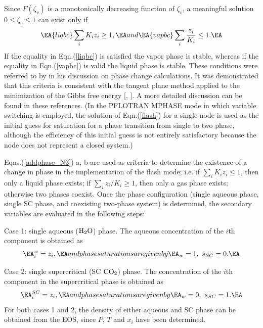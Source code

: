 \documentclass[12pt]{article}
\def\BA#1\EA{\begin{align}#1\end{align}}
\renewcommand{\c}{{\rm CO_2}}
\newcommand{\w}{{\rm H_2O}}
\begin{document}
Since $F(\zeta_v)$ is a monotonically decreasing function of $\zeta_v$, a meaningful solution $0\leq\zeta_v\leq1$ can exist only if 
\begin{subequations}\label{addphase_N3}
\BA\label{liqbc}
\sum_i K_i z_i \geq 1,
\EA
and
\BA\label{vapbc}
\sum_i \frac{z_i}{K_i} \leq 1.
\EA
\end{subequations}
If the equality in Eqn.(\ref{liqbc}) is satisfied the vapor phase is stable, whereas if the equality in Eqn.(\ref{vapbc}) is valid the liquid phase is stable. 
These conditions were referred to by \cite{michelsen-2-1982} in his discussion on phase change calculations. 
It was demonstrated that this criteria is consistent with the tangent plane method applied to the minimization of the Gibbs free energy [\cite{michelsen-1-1982}, \cite{nghiem-1985}]. A more detailed discussion can be found in these references. (In the PFLOTRAN MPHASE mode in which variable switching is employed, the solution of Eqn.(\ref{flash}) for a single node is used as the initial guess for saturation for a phase transition from single to two phase, although the efficiency of this initial guess is not entirely satisfactory because the node does not represent a closed system.)

Eqns.(\ref{addphase_N3}) a, b are used as criteria to determine the existence of a change in phase in the implementation of the flash mode; i.e. if $\sum_i K_i z_i \leq 1$, then only a liquid phase exists; if $\sum_i {z_i}/{K_i} \geq 1$, then only a gas phase exists; otherwise two phases coexist. Once the phase configuration (single aqueous phase, single SC phase, and coexisting two-phase system) is determined, the secondary variables are evaluated in the following steps: 

\noindent
Case 1: single aqueous ($\w$) phase.
The aqueous concentration of the $i$th component is obtained as
\begin{subequations}\label{fla-sec-c1}
\BA
x_i^w = z_i,
\EA
and phase saturations are given by
\BA
s_w = 1, \ s_{SC} =0.
\EA
\end{subequations}

\noindent
Case 2: single supercritical (SC $\c$) phase.
The concentration of the $i$th component in the supercritical phase is obtained as
\begin{subequations}\label{fla-sec-c2}
\BA
x_i^{SC} = z_i,
\EA
and phase saturations are given by
\BA
 s_w = 0, \ s_{SC} =1.
\EA
\end{subequations}
For both cases 1 and 2, the density of either aqueous and SC phase can be obtained from the EOS, since $P$, $T$ and $x_i$ have been determined.
\end{document}
